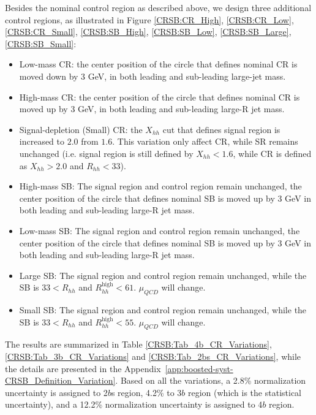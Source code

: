 Besides the nominal control region as described above, we design three additional control regions, as illustrated in Figure \ref{CRSB:CR_High}, \ref{CRSB:CR_Low}, \ref{CRSB:CR_Small}, \ref{CRSB:SB_High}, \ref{CRSB:SB_Low}, \ref{CRSB:SB_Large}, \ref{CRSB:SB_Small}:
\begin{itemize}
	\item Low-mass CR: the center position of the circle that defines nominal CR is moved down by 3 GeV, in both leading and sub-leading large-jet mass.
	\item High-mass CR: the center position of the circle that defines nominal CR is moved up by 3 GeV, in both leading and sub-leading large-R jet mass.
	\item Signal-depletion (Small) CR: the $X_{hh}$ cut that defines signal region is increased to $2.0$ from $1.6$. This variation only affect CR, while SR remains unchanged (i.e. signal region is still defined by $X_{hh}<1.6$, while CR is defined as $X_{hh}>2.0$ and $R_{hh}<33$).
	\item High-mass SB: The signal region and control region remain unchanged, the center position of the circle that defines nominal SB is moved up by 3 GeV in both leading and sub-leading large-R jet mass.
	\item Low-mass SB: The signal region and control region remain unchanged, the center position of the circle that defines nominal SB is moved up by 3 GeV in both leading and sub-leading large-R jet mass.
	\item Large SB: The signal region and control region remain unchanged, while the SB is $33 < R_{hh}$ and $ R_{hh}^{\text{high}} < 61$. $\mu_{QCD}$ will change.
	\item Small SB: The signal region and control region remain unchanged, while the SB is $33 < R_{hh}$ and $ R_{hh}^{\text{high}} < 55$. $\mu_{QCD}$ will change.
\end{itemize}

The results are summarized in Table \ref{CRSB:Tab_4b_CR_Variations}, \ref{CRSB:Tab_3b_CR_Variations} and \ref{CRSB:Tab_2bs_CR_Variations}, while the details are presented in the Appendix~\ref{app:boosted-syst-CRSB_Definition_Variation}. Based on all the variations, a 2.8\% normalization uncertainty is assigned to 2$b$s region, 4.2\% to 3$b$ region (which is the statistical uncertainty), and a 12.2\% normalization uncertainty is assigned to 4$b$ region.

